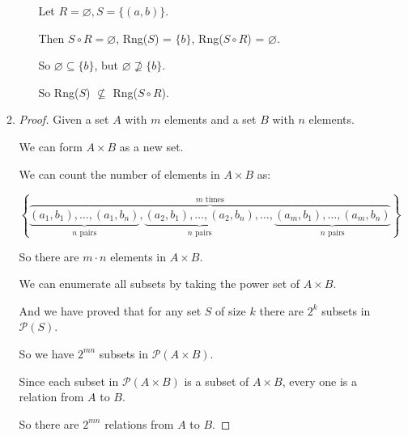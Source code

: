 \documentclass[12pt,letterpaper]{article}
\begin{document}
\begin{enumerate}
\begin{enumerate}
\begin{enumerate}
              Let $R = \varnothing, S = \{(a, b)\}$.

              Then $S \circ R = \varnothing$, Rng($S$) = $\{b\}$, Rng($S \circ R$) = $\varnothing$.

              So $\varnothing \subseteq \{b\}$, but $\varnothing \not\supseteq \{b\}$.

              So Rng($S$) $\not\subseteq$ Rng($S \circ R$).
          \end{enumerate}
        \setcounter{enumii}{11}
        \item
          \begin{proof}
            Given a set $A$ with $m$ elements and a set $B$ with $n$ elements.

            We can form $A \times B$ as a new set.

            We can count the number of elements in $A \times B$ as:

            \[\left\{\overbrace{\underbrace{(a_1, b_1), \dots, (a_1, b_n)}_{n \text{ pairs}}, \underbrace{(a_2, b_1), \dots, (a_2, b_n)}_{n \text{ pairs}}, \dots, \underbrace{(a_m, b_1), \dots, (a_m, b_n)}_{n \text{ pairs}}}^{m \text{ times}}\right\}\]

            So there are $m \cdot n$ elements in $A \times B$.

            We can enumerate all subsets by taking the power set of $A \times B$.

            And we have proved that for any set $S$ of size $k$ there are $2^k$ subsets in $\mathcal{P}(S)$.

            So we have $2^{mn}$ subsets in $\mathcal{P}(A \times B)$.

            Since each subset in $\mathcal{P}(A \times B)$ is a subset of $A \times B$, every one is a relation from $A$ to $B$.

            So there are $2^{mn}$ relations from $A$ to $B$.
          \end{proof}
      \end{enumerate}
  \end{enumerate}
\end{document}
